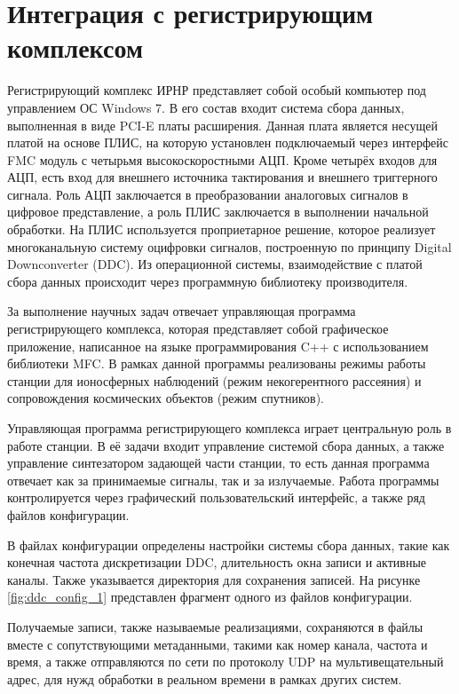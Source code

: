 \documentclass{report}
\begin{document}
\section{Интеграция с регистрирующим комплексом}

Регистрирующий комплекс ИРНР представляет собой особый компьютер под управлением ОС Windows 7. В его состав входит система сбора данных, выполненная в виде PCI-E платы расширения. Данная плата является несущей платой на основе ПЛИС, на которую установлен подключаемый через интерфейс FMC модуль с четырьмя высокоскоростными АЦП. Кроме четырёх входов для АЦП, есть вход для внешнего источника тактирования и внешнего триггерного сигнала. Роль АЦП заключается в преобразовании аналоговых сигналов в цифровое представление, а роль ПЛИС заключается в выполнении начальной обработки. На ПЛИС используется проприетарное решение, которое реализует многоканальную систему оцифровки сигналов, построенную по принципу Digital Downconverter (DDC). Из операционной системы, взаимодействие с платой сбора данных происходит через программную библиотеку производителя.

За выполнение научных задач отвечает управляющая программа регистрирующего комплекса, которая представляет собой графическое приложение, написанное на языке программирования C++ с использованием библиотеки MFC. В рамках данной программы реализованы режимы работы станции для ионосферных наблюдений (режим некогерентного рассеяния) и сопровождения космических объектов (режим спутников).

Управляющая программа регистрирующего комплекса играет центральную роль в работе станции. В её задачи входит управление системой сбора данных, а также управление синтезатором задающей части станции, то есть данная программа отвечает как за принимаемые сигналы, так и за излучаемые. Работа программы контролируется через графический пользовательский интерфейс, а также ряд файлов конфигурации.

В файлах конфигурации определены настройки системы сбора данных, такие как конечная частота дискретизации DDC, длительность окна записи и активные каналы. Также указывается директория для сохранения записей. На рисунке \ref{fig:ddc_config_1} представлен фрагмент одного из файлов конфигурации.


Получаемые записи, также называемые реализациями, сохраняются в файлы вместе с сопутствующими метаданными, такими как номер канала, частота и время, а также отправляются по сети по протоколу UDP на мультивещательный адрес, для нужд обработки в реальном времени в рамках других систем.
\end{document}
